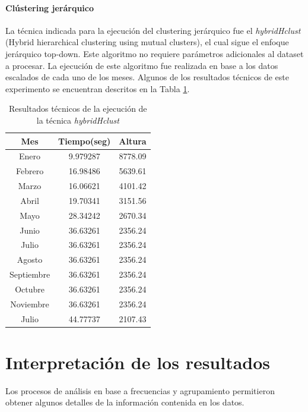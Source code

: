 \documentclass[12pt]{article}
\numberwithin{equation}{section}
\numberwithin{table}{section}
\numberwithin{figure}{section}
\begin{document}
\paragraph{Clústering jerárquico}
La técnica indicada para la ejecución del clustering jerárquico fue el \emph{hybridHclust} (Hybrid hierarchical clustering using mutual clusters), el cual sigue el enfoque jerárquico top-down. Este algoritmo no requiere parámetros adicionales al dataset a procesar.
La ejecución de este algoritmo fue realizada en base a los datos escalados de cada uno de los meses.
Algunos de los resultados técnicos de este experimento se encuentran descritos en la Tabla \ref{tbl:resultados-jerarquico}.

\begin{table}[h]
\centering
\begin{tabular}{@{}ccc@{}}
\toprule
\textbf{Mes} & \textbf{Tiempo(seg)} & \textbf{Altura} \\ \midrule
Enero        & 9.979287             & 8778.09                    \\
Febrero      & 16.98486             & 5639.61                    \\
Marzo        & 16.06621             & 4101.42                    \\
Abril        & 19.70341             & 3151.56                    \\
Mayo         & 28.34242             & 2670.34                    \\
Junio        & 36.63261             & 2356.24                    \\
Julio        & 36.63261             & 2356.24                    \\
Agosto       & 36.63261             & 2356.24                    \\
Septiembre   & 36.63261             & 2356.24                    \\
Octubre      & 36.63261             & 2356.24                    \\
Noviembre    & 36.63261             & 2356.24                    \\
Julio        & 44.77737             & 2107.43                    \\ \bottomrule
\end{tabular}
\caption{Resultados técnicos de la ejecución de la técnica \emph{hybridHclust}}
\label{tbl:resultados-jerarquico}
\end{table}


\section{Interpretación de los resultados}
Los procesos de análisis en base a frecuencias y agrupamiento permitieron obtener algunos detalles de la información contenida en los datos.
\end{document}
